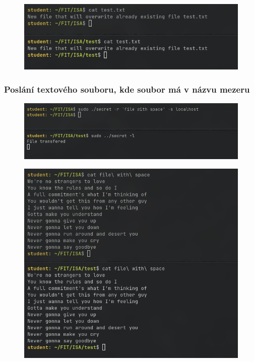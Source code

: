 \documentclass[11pt, a4paper]{article}
\begin{document}
\begin{flushleft}
 
 \begin{figure}[H]
    \centering
    \includegraphics[scale=0.67, keepaspectratio]{img/cmp_txt2.png}
    \label{fig:txt}
 \end{figure}


\subsubsection{Poslání textového souboru, kde soubor má v názvu mezeru}

\begin{figure}[H]
    \centering
    \includegraphics[scale=0.56, keepaspectratio]{img/send_space.png}
    \label{fig:txt}
 \end{figure}
 
 \begin{figure}[H]
    \centering
    \includegraphics[scale=0.65, keepaspectratio]{img/cmp_space.png}
    \label{fig:txt}
 \end{figure}



\end{flushleft}
\end{document}
